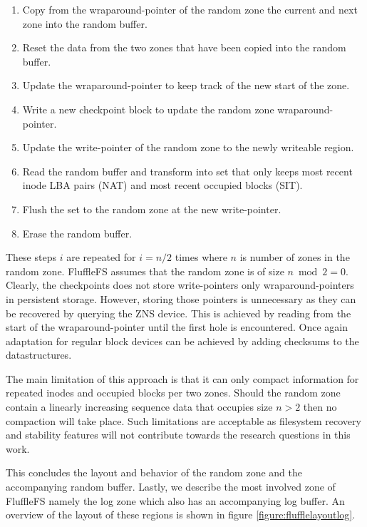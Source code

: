 \begin{enumerate}
    \item Copy from the wraparound-pointer of the random zone the current and
    next zone into the random buffer.
    \item Reset the data from the two zones that have been copied into the
    random buffer.
    \item Update the wraparound-pointer to keep track of the new start of the
    zone.
    \item Write a new checkpoint block to update the random zone
    wraparound-pointer.
    \item Update the write-pointer of the random zone to the newly writeable
    region.
    \item Read the random buffer and transform into set that only keeps
    most recent inode LBA pairs (NAT) and most recent occupied blocks (SIT).
    \item Flush the set to the random zone at the new write-pointer.
    \item Erase the random buffer.
\end{enumerate}

These steps $i$ are repeated for $i = n/2$ times where $n$ is number of zones in
the random zone. FluffleFS assumes that the random zone is of size
$n \bmod 2 = 0$. Clearly, the checkpoints does not store write-pointers only
wraparound-pointers in persistent storage. However, storing those pointers is
unnecessary as they can be recovered by querying the ZNS device. This is
achieved by reading from the start of the wraparound-pointer until the first
hole is encountered. Once again adaptation for regular block devices can be
achieved by adding checksums to the datastructures.

The main limitation of this approach is that it can only compact information
for repeated inodes and occupied blocks per two zones. Should the random zone
contain a linearly increasing sequence data that occupies size $n > 2$ then no
compaction will take place. Such limitations are acceptable as filesystem
recovery and stability features will not contribute towards the research
questions in this work.

This concludes the layout and behavior of the random zone and the accompanying
random buffer. Lastly, we describe the most involved zone of FluffleFS namely
the log zone which also has an accompanying log buffer. An overview of the
layout of these regions is shown in figure \ref{figure:flufflelayoutlog}.

